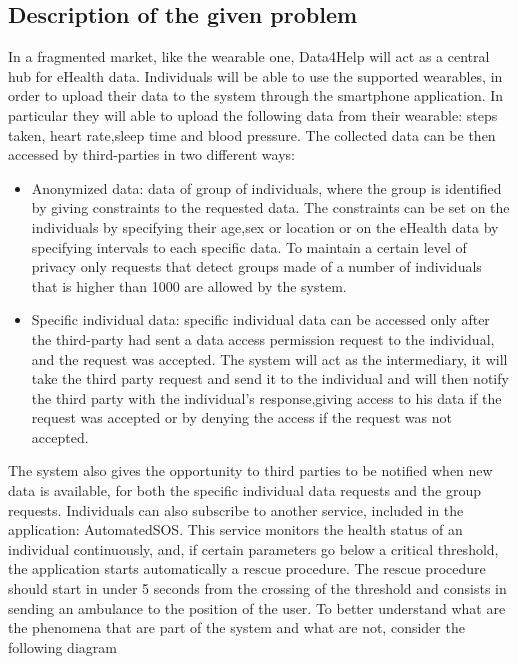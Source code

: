 \subsection{Description of the given problem}
In a fragmented market, like the wearable one, Data4Help will act as a central hub for eHealth data.
Individuals will be able to use the supported wearables, in order to upload their data to the system through the smartphone application. In particular they will able to upload the following data from their wearable: steps taken, heart rate,sleep time and blood pressure.
\givespace
The collected data can be then accessed by third-parties in two different ways:
\begin{itemize}
\item Anonymized data: data of group of individuals, where the group is identified by giving constraints to the requested data. The constraints can be set on the individuals by specifying their age,sex or location or on the eHealth data by specifying intervals to each specific data. To maintain a certain level of privacy only requests that detect groups made of a number of individuals that is higher than 1000 are allowed by the system.
\item Specific individual data: specific individual data can be accessed only after the third-party had sent a data access permission request to the individual, and the request was accepted. The system will act as the intermediary, it will take the third party request and send it to the individual and will then notify the third party with the individual's response,giving access to his data if the request was accepted or by denying the access if the request was not accepted.
\end{itemize}
The system also gives the opportunity to third parties to be notified when new data is available, for both the specific individual data requests and the group requests.
\givespace
Individuals can also subscribe to another service, included in the application: AutomatedSOS. This service monitors the health status of an individual continuously, and, if certain parameters go below a critical threshold, the application starts automatically a rescue procedure. The rescue procedure should start in under 5 seconds from the crossing of the threshold and consists in sending an ambulance to the position of the user.
\givespace
To better understand what are the phenomena that are part of the system and what are not, consider the following diagram
